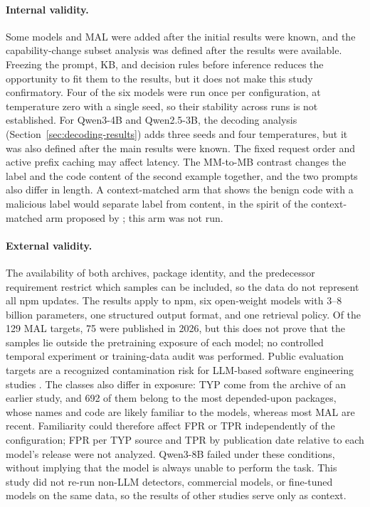 \documentclass[a4paper,fleqn]{cas-dc}
\begin{document}
\paragraph{Internal validity.}
Some models and MAL were added after the initial results were known, and the
capability-change subset analysis was defined after the results were available.
Freezing the prompt, KB, and decision rules before inference reduces the
opportunity to fit them to the results, but it does not make this study
confirmatory. Four of the six models were run once per configuration, at
temperature zero with a single seed, so their stability across runs is not
established. For Qwen3-4B and Qwen2.5-3B, the decoding analysis
(Section~\ref{sec:decoding-results}) adds three seeds and four temperatures, but
it was also defined after the main results were known. The fixed request order and
active prefix caching may affect latency. The MM-to-MB contrast changes the label
and the code content of the second example together, and the two prompts also
differ in length. A context-matched arm that shows the benign code with a
malicious label would separate label from content, in the spirit of the
context-matched arm proposed by \citet{malhotra2027llm}; this arm was not run.

\paragraph{External validity.}
The availability of both archives, package identity, and the predecessor
requirement restrict which samples can be included, so the data do not represent
all npm updates. The results apply to npm, six open-weight models with
3--8 billion parameters, one structured output format, and one retrieval policy.
Of the 129 MAL targets, 75 were published in 2026, but this does not prove that
the samples lie outside the pretraining exposure of each model; no controlled
temporal experiment or training-data audit was performed. Public evaluation
targets are a recognized contamination risk for LLM-based software engineering
studies \citep{malhotra2027llm}. The classes also differ in exposure: TYP come
from the archive of an earlier study, and 692 of them belong to the most
depended-upon packages, whose names and code are likely familiar to the models,
whereas most MAL are recent. Familiarity could therefore affect FPR or TPR
independently of the configuration; FPR per TYP source and TPR by publication date
relative to each model's release were not analyzed. Qwen3-8B failed under
these conditions, without implying that the model is always unable to perform the
task. This study did not re-run non-LLM detectors, commercial models, or
fine-tuned models on the same data, so the results of other studies serve only as
context.
\end{document}
